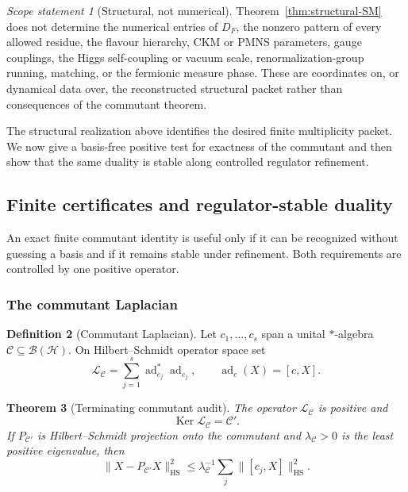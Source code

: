 \documentclass[11pt]{article}
\newtheorem{theorem}{Theorem}[section]
\theoremstyle{definition}
\newtheorem{definition}[theorem]{Definition}
\theoremstyle{remark}
\newtheorem{scope}[theorem]{Scope statement}
\newcommand{\Ker}{\operatorname{Ker}}
\newcommand{\HS}{\mathrm{HS}}
\newcommand{\norm}[1]{\lVert#1\rVert}
\newcommand{\Hh}{\mathcal H}
\begin{document}
\begin{scope}[Structural, not numerical]
\label{scope:structural}
Theorem~\ref{thm:structural-SM} does not determine the numerical entries of
$D_F$, the nonzero pattern of every allowed residue, the flavour hierarchy,
CKM or PMNS parameters, gauge couplings, the Higgs self-coupling or vacuum
scale, renormalization-group running, matching, or the fermionic measure
phase.  These are coordinates on, or dynamical data over, the reconstructed
structural packet rather than consequences of the commutant theorem.
\end{scope}


\medskip
The structural realization above identifies the desired finite multiplicity
packet.  We now give a basis-free positive test for exactness of the commutant
and then show that the same duality is stable along controlled regulator
refinement.

\subsection{Finite certificates and regulator-stable duality}
\label{sec:certificate}

An exact finite commutant identity is useful only if it can be recognized
without guessing a basis and if it remains stable under refinement.  Both
requirements are controlled by one positive operator.

\subsubsection{The commutant Laplacian}

\begin{definition}[Commutant Laplacian]
\label{def:commutant-laplacian}
Let $c_1,\ldots,c_s$ span a unital $*$-algebra
$\mathcal C\subseteq\mathcal B(\Hh)$.  On Hilbert--Schmidt operator space set
\begin{equation}
\boxed{
\mathscr L_{\mathcal C}
=
\sum_{j=1}^{s}
\operatorname{ad}_{c_j}^*\operatorname{ad}_{c_j},
\qquad
\operatorname{ad}_{c}(X)=[c,X].}
\label{eq:commutant-laplacian}
\end{equation}
\end{definition}

\begin{theorem}[Terminating commutant audit]
\label{thm:commutant-audit}
The operator $\mathscr L_{\mathcal C}$ is positive and
\begin{equation}
\boxed{\Ker\mathscr L_{\mathcal C}=\mathcal C'.}
\label{eq:commutant-kernel}
\end{equation}
If $P_{\mathcal C'}$ is Hilbert--Schmidt projection onto the commutant and
$\lambda_{\mathcal C}>0$ is the least positive eigenvalue, then
\begin{equation}
\boxed{
\norm{X-P_{\mathcal C'}X}_{\HS}^2
\le
\lambda_{\mathcal C}^{-1}
\sum_j\norm{[c_j,X]}_{\HS}^2.}
\label{eq:commutant-coercivity}
\end{equation}
\end{theorem}
\end{document}
